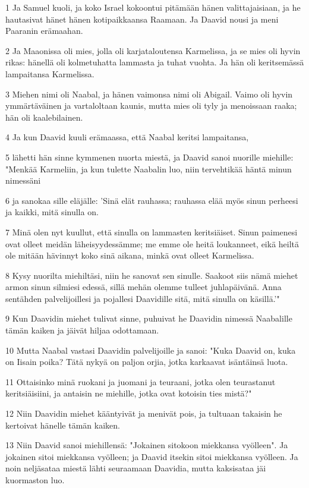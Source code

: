 \par 1 Ja Samuel kuoli, ja koko Israel kokoontui pitämään hänen valittajaisiaan, ja he hautasivat hänet hänen kotipaikkaansa Raamaan. Ja Daavid nousi ja meni Paaranin erämaahan.
\par 2 Ja Maaonissa oli mies, jolla oli karjataloutensa Karmelissa, ja se mies oli hyvin rikas: hänellä oli kolmetuhatta lammasta ja tuhat vuohta. Ja hän oli keritsemässä lampaitansa Karmelissa.
\par 3 Miehen nimi oli Naabal, ja hänen vaimonsa nimi oli Abigail. Vaimo oli hyvin ymmärtäväinen ja vartaloltaan kaunis, mutta mies oli tyly ja menoissaan raaka; hän oli kaalebilainen.
\par 4 Ja kun Daavid kuuli erämaassa, että Naabal keritsi lampaitansa,
\par 5 lähetti hän sinne kymmenen nuorta miestä, ja Daavid sanoi nuorille miehille: "Menkää Karmeliin, ja kun tulette Naabalin luo, niin tervehtikää häntä minun nimessäni
\par 6 ja sanokaa sille eläjälle: 'Sinä elät rauhassa; rauhassa elää myös sinun perheesi ja kaikki, mitä sinulla on.
\par 7 Minä olen nyt kuullut, että sinulla on lammasten keritsiäiset. Sinun paimenesi ovat olleet meidän läheisyydessämme; me emme ole heitä loukanneet, eikä heiltä ole mitään hävinnyt koko sinä aikana, minkä ovat olleet Karmelissa.
\par 8 Kysy nuorilta miehiltäsi, niin he sanovat sen sinulle. Saakoot siis nämä miehet armon sinun silmiesi edessä, sillä mehän olemme tulleet juhlapäivänä. Anna sentähden palvelijoillesi ja pojallesi Daavidille sitä, mitä sinulla on käsillä.'"
\par 9 Kun Daavidin miehet tulivat sinne, puhuivat he Daavidin nimessä Naabalille tämän kaiken ja jäivät hiljaa odottamaan.
\par 10 Mutta Naabal vastasi Daavidin palvelijoille ja sanoi: "Kuka Daavid on, kuka on Iisain poika? Tätä nykyä on paljon orjia, jotka karkaavat isäntäinsä luota.
\par 11 Ottaisinko minä ruokani ja juomani ja teuraani, jotka olen teurastanut keritsiäisiini, ja antaisin ne miehille, jotka ovat kotoisin ties mistä?"
\par 12 Niin Daavidin miehet kääntyivät ja menivät pois, ja tultuaan takaisin he kertoivat hänelle tämän kaiken.
\par 13 Niin Daavid sanoi miehillensä: "Jokainen sitokoon miekkansa vyölleen". Ja jokainen sitoi miekkansa vyölleen; ja Daavid itsekin sitoi miekkansa vyölleen. Ja noin neljäsataa miestä lähti seuraamaan Daavidia, mutta kaksisataa jäi kuormaston luo.

